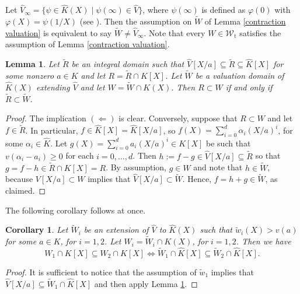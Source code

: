 \documentclass[10pt]{article}
\numberwithin{equation}{section}
\newtheorem{Lem}[equation]{Lemma}
\newtheorem{Cor}[equation]{Corollary}
\theoremstyle{definition}
\theoremstyle{definition}
\newcommand{\Q}{\mathbb{Q}}
\newcommand{\Z}{\mathbb{Z}}
\newcommand{\Int}{\textnormal{Int}}
\newcommand{\IntQ}{\Int_{\Q}}
\newcommand{\K}{\widehat{K}}
\newcommand{\V}{\widehat{V}}
\renewcommand{\t}{\text{t}}
\newcommand{\wW}{\widetilde{W}}
\newcommand{\oZp}{\overline{\Z_p}}
\newcommand\rc { \color{red}}
\begin{document}
Let $\V_{\infty}=\{\psi\in\K(X)\mid \psi(\infty)\in\V\}$, where $\psi(\infty)$ is defined as $\varphi(0)$ with $\varphi(X)=\psi(1/X)$ (see \cite{PerTransc}). Then
the assumption on $\wW$ of Lemma \ref{contraction valuation} is equivalent to say $\wW\not=\V_{\infty}$. 
Note that every $W\in\mathcal{W}_{\t}$ satisfies the assumption of Lemma \ref{contraction valuation}.


\begin{Lem}\label{overring polynomial domain}
Let $\widetilde R$ be an integral domain such that $\V[X/a]\subseteq \widetilde R\subseteq\K[X]$ 
for some nonzero $a\in K$ and let $R=\widetilde R\cap K[X]$. Let $\wW$ be a valuation domain 
of $\K(X)$ extending $\V$  and let $W=\wW\cap K(X)$. Then
$R\subset W$ if and only if $\widetilde R\subset \wW$.
\end{Lem}
\begin{proof}
The implication $(\Leftarrow)$ is clear. Conversely, suppose that $R\subset W$ and let $f\in \widetilde R$. In particular, $f\in\K[X]=\K[X/a]$, so $f(X)=\sum\limits_{i=0}^d \alpha_i (X/a)^i$, for some $\alpha_i\in\K$. Let $g(X)=\sum\limits_{i=0}^d a_i (X/a)^i\in K[X]$ be such that $v(\alpha_i-a_i)\geq0$ for each $i=0,\ldots,d$. Then $h:=f-g\in \V[X/a]\subseteq\widetilde{R}$ so that $g=f-h\in \widetilde R\cap K[X]=R$. By assumption, $g\in W$ and note that $h\in \wW$, because $V[X/a]\subset W$ implies that $\V[X/a]\subset \wW$. Hence,  $f=h+g\in \wW$, as claimed.
\end{proof}

The following corollary follows at once.

\begin{Cor}\label{contraction W polynomial}
Let $\wW_i$ be an extension of $\V$ to $\K(X)$ such that $\tilde w_i(X)>v(a)$ for some $a\in K$, for $i=1,2$. Let $W_i=\wW_i\cap K(X)$, for $i=1,2$. Then we have
\begin{equation}\label{contaiments}
W_1\cap K[X]\subseteq W_2\cap K[X]\Leftrightarrow \wW_1\cap \K[X]\subseteq \wW_2\cap \K[X].
\end{equation}
\end{Cor}
\begin{proof}
It is sufficient to notice that the assumption of $
\tilde w_1$ implies that $\V[X/a]\subseteq\wW_1\cap\K[X]$ and then apply Lemma \ref{overring polynomial domain}.
\end{proof}
\end{document}

